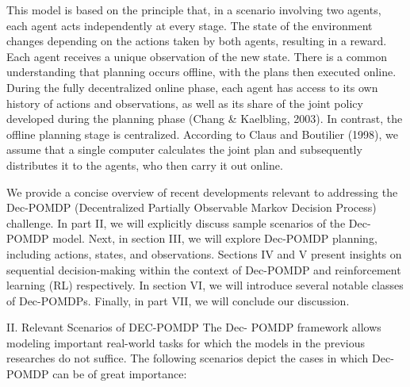 \documentclass[a4paper,11pt,onecolumn]{article}
\begin{document}
This model is based on the principle that, in a scenario involving two agents, each agent acts independently at every stage. The state of the environment changes depending on the actions taken by both agents, resulting in a reward. Each agent receives a unique observation of the new state. There is a common understanding that planning occurs offline, with the plans then executed online. During the fully decentralized online phase, each agent has access to its own history of actions and observations, as well as its share of the joint policy developed during the planning phase (Chang & Kaelbling, 2003). In contrast, the offline planning stage is centralized. According to Claus and Boutilier (1998), we assume that a single computer calculates the joint plan and subsequently distributes it to the agents, who then carry it out online.

We provide a concise overview of recent developments relevant to addressing the Dec-POMDP (Decentralized Partially Observable Markov Decision Process) challenge. In part II, we will explicitly discuss sample scenarios of the Dec-POMDP model. Next, in section III, we will explore Dec-POMDP planning, including actions, states, and observations. Sections IV and V present insights on sequential decision-making within the context of Dec-POMDP and reinforcement learning (RL) respectively. In section VI, we will introduce several notable classes of Dec-POMDPs. Finally, in part VII, we will conclude our discussion.

II. Relevant Scenarios of DEC-POMDP
The Dec- POMDP framework allows modeling important real-world tasks for which the models in the previous researches do not suffice.  The following scenarios depict the cases in which Dec- POMDP can be of great importance:



\end{document}

